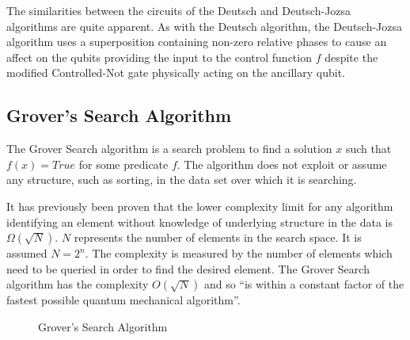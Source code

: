 The similarities between the circuits of the Deutsch and Deutsch-Jozsa algorithms are quite apparent.
As with the Deutsch algorithm, the Deutsch-Jozsa algorithm uses a superposition containing non-zero relative phases to cause an affect on the qubits  providing the input to the control function $f$ despite the modified Controlled-Not gate physically acting on the ancillary qubit.

\subsection{Grover's Search Algorithm}	
\label{sec:grovers}
The Grover Search algorithm\cite{Grover:1996rk} is a search problem to find a solution $x$ such that $f(x)=True$ for some predicate $f$.
The algorithm does not exploit or assume any structure, such as sorting, in the data set over which it is searching.

It has previously been proven\cite{Bennett:1996iu} that the lower complexity limit for any algorithm identifying an element without knowledge of underlying structure in the data is $\Omega(\sqrt{N})$.
$N$ represents the number of elements in the search space.
It is assumed $N=2^n$.
The complexity is measured by the number of elements which need to be queried in order to find the desired element.
The Grover Search algorithm has the complexity $O(\sqrt{N})$ and so ``is within a constant factor of the fastest possible quantum mechanical algorithm''\cite{Grover:1996rk}.

\begin{figure}
\begin{center}

\hspace{20pt}
 
\end{center}
\caption{Grover's Search Algorithm}
\end{figure}



